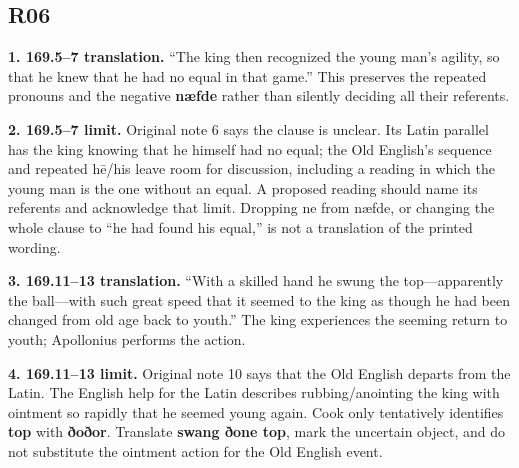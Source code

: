 \subsection*{R06}

\textbf{1. 169.5–7 translation.} “The king then recognized the young man’s agility, so that he knew that he had no equal in that game.” This preserves the repeated pronouns and the negative \textbf{næfde} rather than silently deciding all their referents.

\textbf{2. 169.5–7 limit.} Original note 6 says the clause is unclear. Its Latin parallel has the king knowing that he himself had no equal; the Old English’s sequence and repeated hē/\allowbreak{}his leave room for discussion, including a reading in which the young man is the one without an equal. A proposed reading should name its referents and acknowledge that limit. Dropping ne from næfde, or changing the whole clause to “he had found his equal,” is not a translation of the printed wording.

\textbf{3. 169.11–13 translation.} “With a skilled hand he swung the top—apparently the ball—with such great speed that it seemed to the king as though he had been changed from old age back to youth.” The king experiences the seeming return to youth; Apollonius performs the action.

\textbf{4. 169.11–13 limit.} Original note 10 says that the Old English departs from the Latin. The English help for the Latin describes rubbing/\allowbreak{}anointing the king with ointment so rapidly that he seemed young again. Cook only tentatively identifies \textbf{top} with \textbf{ðoðor}. Translate \textbf{swang ðone top}, mark the uncertain object, and do not substitute the ointment action for the Old English event.


